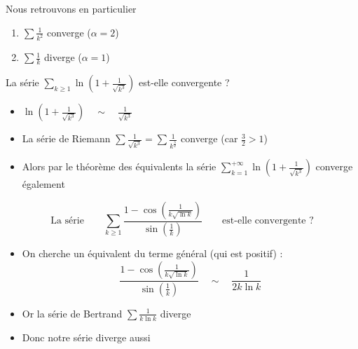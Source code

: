 \begin{frame}
Nous retrouvons en particulier
\begin{enumerate}
  \item $\displaystyle\sum \frac{1}{k^2}$ converge ($\alpha=2$)
  
  \medskip
  
  \item\pause $\displaystyle\sum \frac{1}{k}$ diverge ($\alpha=1$)
\end{enumerate}

\pause
\begin{exemple}
La série  $\displaystyle\sum_{k \ge 1} \ln\left(1+\frac{1}{\sqrt{k^3}}\right)$ est-elle convergente ? 
 
 \begin{itemize}
 \item\pause $\ln\left(1+\frac{1}{\sqrt{k^3}}\right) \quad \sim \quad \frac{1}{\sqrt{k^3}}$
\item\pause La série de Riemann $\sum \frac{1}{\sqrt{k^3}}=\sum \frac{1}{k^{\frac32}}$ converge (car $\frac32>1$) 
\item\pause Alors par le théorème des équivalents la série $\displaystyle\sum_{k=1}^{+\infty} \ln\left(1+\frac{1}{\sqrt{k^3}}\right)$ converge également
\end{itemize}
\end{exemple}

 \end{frame}


\begin{frame}
\begin{exemple}

$$\text{La série}\qquad\sum_{k \ge 1} 
\frac{1-\cos\left(\frac{1}{k\sqrt{\ln k}}\right)}{\sin\left(\frac{1}{k}\right)}
\qquad\text{est-elle convergente ?}$$
  
 \begin{itemize}
 \item\pause On cherche un équivalent du terme général (qui est positif) :  
$$\frac{1-\cos\left(\frac{1}{k\sqrt{\ln k}}\right)}
{\sin\left(\frac{1}{k}\right)} \quad \sim \quad \frac{1}{2k\ln k}$$
\item\pause Or la série de Bertrand $\sum \frac{1}{k\ln k}$ diverge
\item\pause Donc notre série diverge aussi
\end{itemize}
\end{exemple}
\end{frame}


